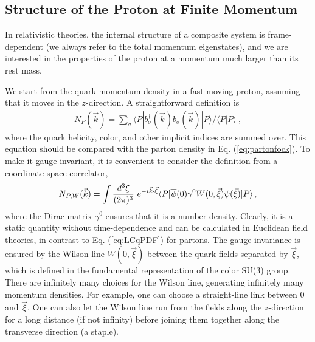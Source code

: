 \documentclass[aps,rmp,reprint,amsmath,amssymb,graphicx,longbibliography]{revtex4-1} %
\begin{document}
\subsection{Structure of the Proton at Finite Momentum}
\label{sec:lamet-frame}
In relativistic theories, the internal structure of
a composite system is frame-dependent (we always refer to the total momentum eigenstates),
and we are interested in the properties of the proton
at a momentum much larger than its rest mass.

We start from the quark momentum density in a fast-moving proton, assuming that it moves in the $z$-direction. A
straightforward definition is
\begin{align}
	N_P(\vec{k})=\sum_\sigma \langle P|b^\dagger_\sigma (\vec{k}) b_\sigma
	(\vec{k})|P\rangle/\langle P|P\rangle \ ,
\end{align}
where the quark helicity, color, and other implicit indices are summed over.
This equation should be compared with the parton density in Eq. (\ref{eq:partonfock}).
To make it gauge invariant, it is convenient to consider
the definition from a coordinate-space correlator,
\begin{align}
	N_{P,W}(\vec{k})=\int {d^3\xi\over {(2\pi)^3}} \ e^{-i\vec{k}\cdot \vec{\xi}}
	\langle P|\overline{\psi}(0)\gamma^0W(0,\vec{\xi})\psi(\vec{\xi})|P\rangle\,,
\end{align}
where the Dirac matrix $\gamma^0$ ensures that it is a number density. Clearly,
it is a static quantity without time-dependence and can be calculated
in Euclidean field theories, in contrast to Eq. (\ref{eq:LCqPDF}) for partons.
The gauge invariance is ensured by the Wilson line $W(0,\vec{\xi})$
between the quark fields separated by $\vec{\xi}$, which is defined in the fundamental representation of the color SU(3) group. There are infinitely many
choices for the Wilson line, generating infinitely many momentum densities.
For example, one can choose a straight-line link between $0$ and $\vec{\xi}$.
One can also let the Wilson line run from the fields along the $z$-direction for
a long distance (if not infinity) before joining them together along
the transverse direction (a staple).
\end{document}
